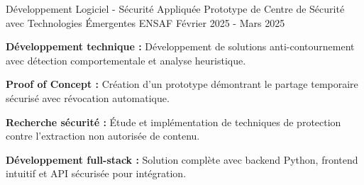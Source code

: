 \begin{cventries}
    \cventry
    {Développement Logiciel - Sécurité Appliquée}
    {Prototype de Centre de Sécurité avec Technologies Émergentes} %
    {ENSAF} %
    {Février 2025 - Mars 2025} %
    {
        \begin{cvitems} %
            \item {
                        \textbf{Développement technique :}
                        Développement de solutions anti-contournement avec détection comportementale et analyse heuristique.}
            \item {
                        \textbf{Proof of Concept :}
                        Création d'un prototype démontrant le partage temporaire sécurisé avec révocation automatique.}
            \item {
                        \textbf{Recherche sécurité :}
                        Étude et implémentation de techniques de protection contre l'extraction non autorisée de contenu.}
            \item {
                        \textbf{Développement full-stack :}
                        Solution complète avec backend Python, frontend intuitif et API sécurisée pour intégration.}
        \end{cvitems}
    }

\end{cventries}